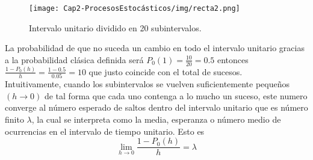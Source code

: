     \begin{center}
        \begin{figure}[htb]
           \texttt{[image: Cap2-ProcesosEstocásticos/img/recta2.png]}
           \caption{Intervalo unitario dividido en 20 subintervalos.}
        \label{figurarecta2}
        \vspace*{0.05in}
        \end{figure}
    \end{center}
    La probabilidad de que no suceda un cambio en todo el intervalo unitario gracias a la probabilidad clásica definida será $P_0(1)=\frac{10}{20}=0.5$ entonces $\frac{1-P_0(h)}{h}=\frac{1-0.5}{0.05}=10$ que justo coincide con el total de sucesos.\\
    Intuitivamente, cuando los subintervalos se vuelven suficientemente pequeños $(h\rightarrow 0)$ de tal forma que cada uno contenga a lo mucho un suceso, este numero converge al número esperado de saltos dentro del intervalo unitario que es número finito $\lambda$, la cual se interpreta como la media, esperanza o número medio de ocurrencias en el intervalo de tiempo unitario.
    Esto es
    $$  \lim_{h\rightarrow 0}\frac{1-P_0(h)}{h}=\lambda
    $$
  

